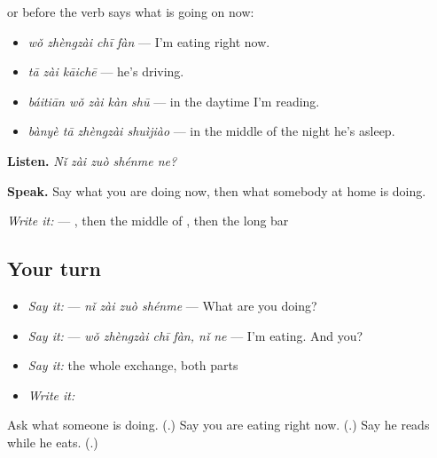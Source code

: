 \begin{grammarlens}[title={What you've built — now, and two things at once}]
 or  before the verb says what is going on now:

\begin{itemize}
\raggedright
  \item \textbf{} \emph{wǒ zhèngzài chī fàn} — I'm eating right now.
  \item \textbf{} \emph{tā zài kāichē} — he's driving.
  \item \textbf{} \emph{báitiān wǒ zài kàn shū} — in the daytime I'm reading.
  \item \emph{bànyè tā zhèngzài shuìjiào} — in the middle of the night he's asleep.
\end{itemize}

\textbf{Listen.} \emph{Nǐ zài zuò shénme ne?}

\textbf{Speak.} Say what you are doing now, then what somebody at home is doing.

\emph{Write it:}  — , then the middle of , then the long bar
\end{grammarlens}

\subsection*{Your turn}
\begin{itemize}
\raggedright
  \item \emph{Say it:}  — \emph{nǐ zài zuò shénme} — What are you doing?
  \item \emph{Say it:}   — \emph{wǒ zhèngzài chī fàn, nǐ ne} — I'm eating. And you?
  \item \emph{Say it:} the whole exchange, both parts
  \item \emph{Write it:} 
\end{itemize}

\begin{tcolorbox}[breakable,colback=teal!4,colframe=teal!35!black,title={Before you move on}]
Ask what someone is doing. (\textbf{}.) Say you are eating right now. (\textbf{}.) Say he reads while he eats. (\textbf{}.)
\end{tcolorbox}
